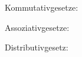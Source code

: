 Kommutativgesetze:\medskip
\formrow{\ca\opadd\cb=\cb\opadd\ca}
\formrow{\ca\opmul\cb=\cb\opmul\ca}

Assoziativgesetze:\medskip
\formrow{(\ca\opadd\cb)\opadd\cc=\ca\opadd(\cb\opadd\cc)}
\formrow{(\ca\opmul\cb)\opmul\cc=\ca\opmul(\cb\opmul\cc)}

Distributivgesetz:\medskip
\formrow{\ca\opmul(\cb\opadd\cc)=\ca\opmul\cb\opadd\ca\opmul\cc}

